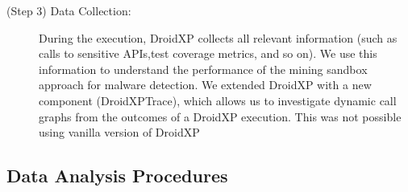 \begin{description}
\item[(Step 3) Data Collection:] During the execution, DroidXP collects all relevant information (such as calls to sensitive APIs,test coverage metrics, and so on). We use this information to understand the performance of the mining sandbox approach for malware detection. We extended DroidXP with a new component (DroidXPTrace), which allows us to investigate dynamic call graphs from the outcomes of a DroidXP execution. This was not possible using vanilla version of DroidXP %
\end{description}


\subsection{Data Analysis Procedures} \label{sec:dataAnalysisProc}

